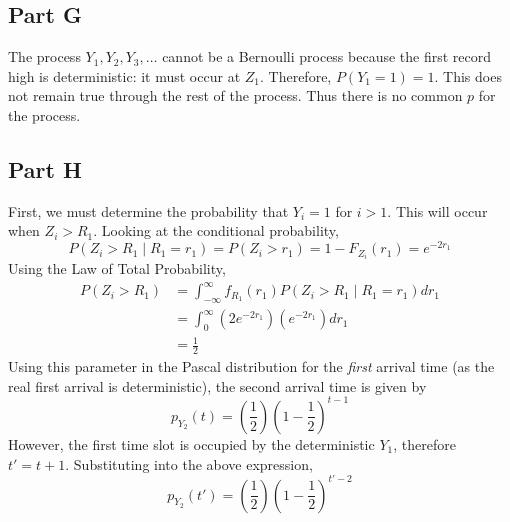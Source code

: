 \documentclass{article}
\begin{document}
\subsection*{Part G}

The process $Y_1, Y_2, Y_3, \ldots$ cannot be a Bernoulli process because the
first record high is deterministic: it must occur at $Z_1$. Therefore, $P(Y_1
= 1) = 1$. This does not remain true through the rest of the process. Thus
there is no common $p$ for the process.

\subsection*{Part H}

First, we must determine the probability that $Y_i = 1$ for $i > 1$. This
will occur when $Z_i > R_1$. Looking at the conditional probability,
$$ P(Z_i > R_1 \mid R_1 = r_1) = P(Z_i > r_1) = 1 - F_{Z_i}(r_1) = e^{-2 r_1} $$
Using the Law of Total Probability,
\begin{align*}
  P(Z_i > R_1) &= \int_{-\infty}^{\infty} f_{R_1}(r_1) P(Z_i > R_1 \mid R_1 =
  r_1) dr_1 \\
  &= \int_0^{\infty} \left(2 e^{-2r_1}\right) \left(e^{-2 r_1}\right) dr_1 \\
  &= \frac{1}{2}
\end{align*}
Using this parameter in the Pascal distribution for the \textit{first}
arrival time (as the real first arrival is deterministic), the second arrival
time is given by
$$ p_{Y_2}(t) = \left(\frac{1}{2}\right) \left(1 - \frac{1}{2}\right)^{t - 1} $$
However, the first time slot is occupied by the deterministic $Y_1$,
therefore $t' = t + 1$. Substituting into the above expression,
$$ p_{Y_2}(t') = \left(\frac{1}{2}\right) \left(1 - \frac{1}{2}\right)^{t' -
2} $$
\end{document}
